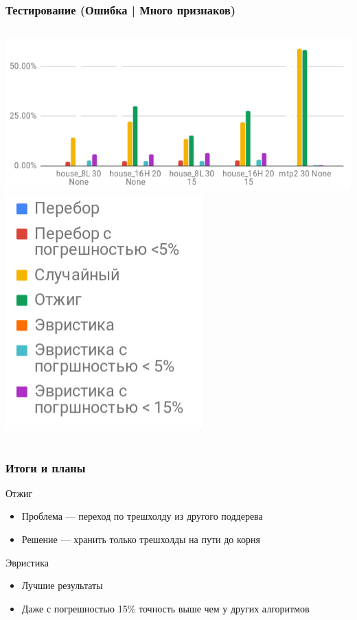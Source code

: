 \documentclass{beamer}
\begin{document}
\begin{frame} \frametitle{Тестирование (Ошибка | Много признаков)}
    \vfill
    \begin{columns}
        \includegraphics[width=\textwidth]{error_features.png}
        \includegraphics[width=\textwidth]{time_legend.png}
    \end{columns}
\end{frame}

\begin{frame} \frametitle{Итоги и планы}
    Отжиг
    \begin{itemize}
            \item Проблема --- переход по трешхолду из другого поддерева
            \item Решение --- хранить только трешхолды на пути до корня 
    \end{itemize}
    Эвристика
    \begin{itemize}
            \item Лучшие результаты
            \item Даже с погрешностью 15\% точность выше чем у других алгоритмов
    \end{itemize}
\end{frame}
\end{document}
